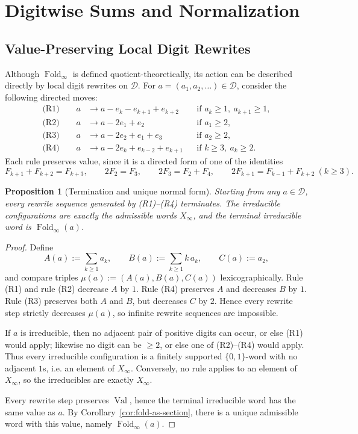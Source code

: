 \documentclass[11pt,letterpaper]{article}
\numberwithin{equation}{section}
\theoremstyle{plain}
\newtheorem{proposition}[theorem]{Proposition}
\theoremstyle{definition}
\theoremstyle{remark}
\newcommand{\D}{\mathcal{D}}
\newcommand{\Xinf}{X_\infty}
\newcommand{\leanverified}[1]{}
\DeclareMathOperator{\Val}{Val}
\DeclareMathOperator{\Fold}{Fold}
\begin{document}
\section{Digitwise Sums and Normalization}\label{sec:overlay}

\subsection{Value-Preserving Local Digit Rewrites}

Although $\Fold_\infty$ is defined quotient-theoretically, its action can be
described directly by local digit rewrites on $\D$.  For
$a=(a_1,a_2,\ldots)\in\D$, consider the following directed moves:
\begin{align*}
\text{(R1)}\qquad
a&\to a-e_k-e_{k+1}+e_{k+2}
&&\text{if } a_k\ge 1,\ a_{k+1}\ge 1,\\
\text{(R2)}\qquad
a&\to a-2e_1+e_2
&&\text{if } a_1\ge 2,\\
\text{(R3)}\qquad
a&\to a-2e_2+e_1+e_3
&&\text{if } a_2\ge 2,\\
\text{(R4)}\qquad
a&\to a-2e_k+e_{k-2}+e_{k+1}
&&\text{if } k\ge 3,\ a_k\ge 2.
\end{align*}
Each rule preserves value, since it is a directed form of one of the
identities
\[
F_{k+1}+F_{k+2}=F_{k+3},\qquad
2F_2=F_3,\qquad
2F_3=F_2+F_4,\qquad
2F_{k+1}=F_{k-1}+F_{k+2}\ (k\ge 3).
\]

\begin{proposition}[Termination and unique normal form]\label{prop:rewrite-termination}
Starting from any $a\in\D$, every rewrite sequence generated by
\textup{(R1)}--\textup{(R4)} terminates.  The irreducible configurations are
exactly the admissible words $\Xinf$, and the terminal irreducible word is
$\Fold_\infty(a)$.
\leanverified{paper_zeckendorf_rewrite_termination_seeds}
\end{proposition}

\begin{proof}
Define
\[
A(a):=\sum_{k\ge 1} a_k,\qquad
B(a):=\sum_{k\ge 1} k\,a_k,\qquad
C(a):=a_2,
\]
and compare triples $\mu(a):=(A(a),B(a),C(a))$ lexicographically.
Rule \textup{(R1)} and rule \textup{(R2)} decrease $A$ by $1$.
Rule \textup{(R4)} preserves $A$ and decreases $B$ by $1$.
Rule \textup{(R3)} preserves both $A$ and $B$, but decreases $C$ by $2$.
Hence every rewrite step strictly decreases $\mu(a)$, so infinite rewrite
sequences are impossible.

If $a$ is irreducible, then no adjacent pair of positive digits can occur, or
else \textup{(R1)} would apply; likewise no digit can be $\ge 2$, or else one of
\textup{(R2)}--\textup{(R4)} would apply.  Thus every irreducible configuration is a
finitely supported $\{0,1\}$-word with no adjacent $1$s, i.e. an element of
$\Xinf$.  Conversely, no rule applies to an element of $\Xinf$, so the
irreducibles are exactly $\Xinf$.

Every rewrite step preserves $\Val$, hence the terminal irreducible word has
the same value as $a$.  By Corollary~\ref{cor:fold-as-section}, there is a
unique admissible word with this value, namely $\Fold_\infty(a)$.
\end{proof}
\end{document}
